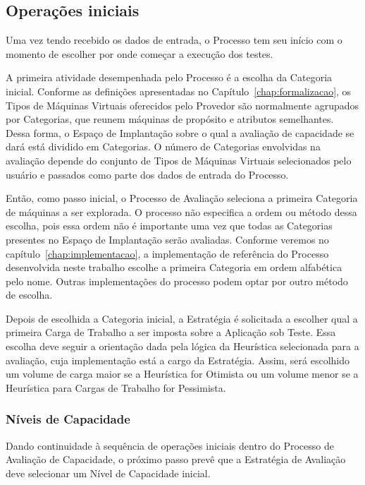\subsection{Operações iniciais}
\label{subsec:processo_operacoes_iniciais}
Uma vez tendo recebido os dados de entrada, o Processo tem seu início com o momento 
de escolher por onde começar a execução dos testes.

A primeira atividade desempenhada pelo Processo é a escolha da Categoria 
inicial. Conforme as definições apresentadas no Capítulo~\ref{chap:formalizacao}, 
os Tipos de Máquinas Virtuais oferecidos pelo Provedor são normalmente agrupados 
por Categorias, que reunem máquinas de propósito e atributos semelhantes. Dessa
forma, o Espaço de Implantação sobre o qual a avaliação de capacidade se dará está 
dividido em Categorias. O número de Categorias envolvidas na avaliação depende do 
conjunto de Tipos de Máquinas Virtuais selecionados pelo usuário e passados como
parte dos dados de entrada do Processo.

Então, como passo inicial, o Processo de Avaliação seleciona a primeira
Categoria de máquinas a ser explorada. O processo não especifica a ordem ou método 
dessa escolha, pois essa ordem não é importante uma vez que todas as Categorias 
presentes no Espaço de Implantação serão avaliadas. Conforme veremos no 
capítulo~\ref{chap:implementacao}, a implementação de referência do Processo 
desenvolvida neste trabalho escolhe a primeira Categoria em ordem alfabética pelo
nome. Outras implementações do processo podem optar por outro método de escolha. 

Depois de escolhida a Categoria inicial, a Estratégia é solicitada a escolher 
qual a primeira Carga de Trabalho a ser imposta sobre a Aplicação sob Teste. Essa 
escolha deve seguir a orientação dada pela lógica da Heurística selecionada para 
a avaliação, cuja implementação está a cargo da Estratégia. Assim, será escolhido
um volume de carga maior se a Heurística for Otimista ou um volume menor se a
Heurística para Cargas de Trabalho for Pessimista.

\subsubsection{Níveis de Capacidade}
\label{subsec:processo_niveis_capacidade}
Dando continuidade à sequência de operações iniciais dentro do Processo de Avaliação 
de Capacidade, o próximo passo prevê que a Estratégia de Avaliação deve selecionar 
um Nível de Capacidade inicial. 

